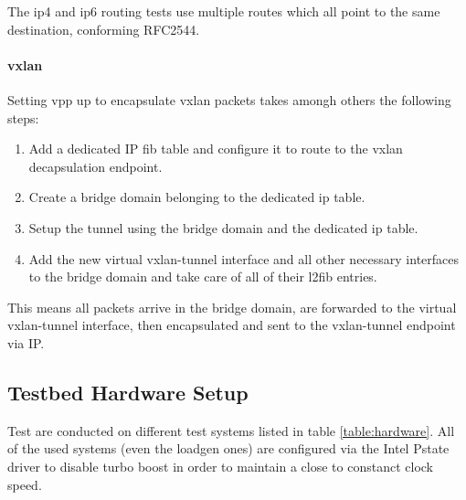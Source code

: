 The \Ac{ip4} and \Ac{ip6} routing tests use multiple routes which all point to the same destination, conforming RFC2544.

\paragraph{\Ac{vxlan}}

Setting \Ac{vpp} up to encapsulate \Ac{vxlan} packets takes amongh others the following steps: 

\begin{enumerate}
	\item Add a dedicated IP \Ac{fib} table and configure it to route to the \Ac{vxlan} decapsulation endpoint.
	\item Create a bridge domain belonging to the dedicated ip table.
	\item Setup the tunnel using the bridge domain and the dedicated ip table.
	\item Add the new virtual vxlan-tunnel interface and all other necessary interfaces to the bridge domain and take care of all of their l2fib entries. 
\end{enumerate}

This means all packets arrive in the bridge domain, are forwarded to
the virtual vxlan-tunnel interface, then encapsulated and sent to the
vxlan-tunnel endpoint via IP.


\subsection{Testbed Hardware Setup}
\label{sec:hardware}

Test are conducted on different test systems listed in table
\ref{table:hardware}. All of the used systems (even the \Ac{loadgen}
ones) are configured via the Intel Pstate driver to disable turbo
boost in order to maintain a close to constanct clock speed.


